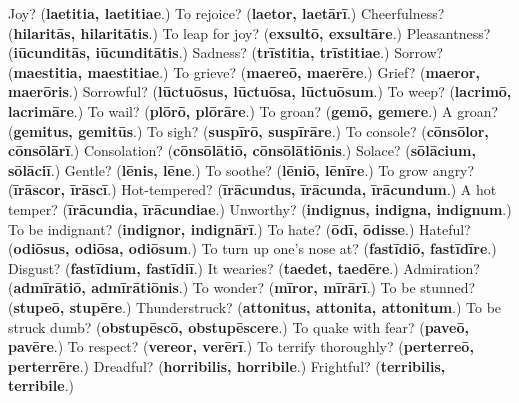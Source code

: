 \begin{tcolorbox}[breakable,colback=teal!4,colframe=teal!35!black,title={Before you move on}]
Joy? (\textbf{laetitia, laetitiae}.) To rejoice? (\textbf{laetor, laetārī}.) Cheerfulness? (\textbf{hilaritās, hilaritātis}.) To leap for joy? (\textbf{exsultō, exsultāre}.) Pleasantness? (\textbf{iūcunditās, iūcunditātis}.) Sadness? (\textbf{trīstitia, trīstitiae}.) Sorrow? (\textbf{maestitia, maestitiae}.) To grieve? (\textbf{maereō, maerēre}.) Grief? (\textbf{maeror, maerōris}.) Sorrowful? (\textbf{lūctuōsus, lūctuōsa, lūctuōsum}.) To weep? (\textbf{lacrimō, lacrimāre}.) To wail? (\textbf{plōrō, plōrāre}.) To groan? (\textbf{gemō, gemere}.) A groan? (\textbf{gemitus, gemitūs}.) To sigh? (\textbf{suspīrō, suspīrāre}.) To console? (\textbf{cōnsōlor, cōnsōlārī}.) Consolation? (\textbf{cōnsōlātiō, cōnsōlātiōnis}.) Solace? (\textbf{sōlācium, sōlāciī}.) Gentle? (\textbf{lēnis, lēne}.) To soothe? (\textbf{lēniō, lēnīre}.) To grow angry? (\textbf{īrāscor, īrāscī}.) Hot-tempered? (\textbf{īrācundus, īrācunda, īrācundum}.) A hot temper? (\textbf{īrācundia, īrācundiae}.) Unworthy? (\textbf{indignus, indigna, indignum}.) To be indignant? (\textbf{indignor, indignārī}.) To hate? (\textbf{ōdī, ōdisse}.) Hateful? (\textbf{odiōsus, odiōsa, odiōsum}.) To turn up one's nose at? (\textbf{fastīdiō, fastīdīre}.) Disgust? (\textbf{fastīdium, fastīdiī}.) It wearies? (\textbf{taedet, taedēre}.) Admiration? (\textbf{admīrātiō, admīrātiōnis}.) To wonder? (\textbf{mīror, mīrārī}.) To be stunned? (\textbf{stupeō, stupēre}.) Thunderstruck? (\textbf{attonitus, attonita, attonitum}.) To be struck dumb? (\textbf{obstupēscō, obstupēscere}.) To quake with fear? (\textbf{paveō, pavēre}.) To respect? (\textbf{vereor, verērī}.) To terrify thoroughly? (\textbf{perterreō, perterrēre}.) Dreadful? (\textbf{horribilis, horribile}.) Frightful? (\textbf{terribilis, terribile}.)
\end{tcolorbox}
